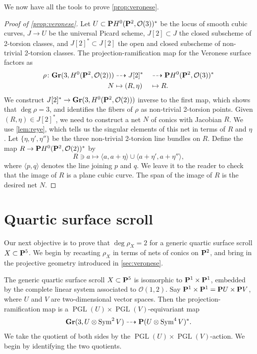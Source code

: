 \documentclass{amsart}
\renewcommand {\P}{{\bf P}}
\providecommand {\Gr}{{\bf Gr}}
\providecommand{\PGL}{\operatorname{PGL}}
\providecommand {\from}{{\colon}}
\providecommand{\Sym}{\operatorname{Sym}}
\numberwithin{equation}{section}
\renewcommand{\O}{\mathcal O}
\begin{document}
We now have all the tools to prove \autoref{prop:veronese}.
\begin{proof}[Proof of \autoref{prop:veronese}]
  Let $U \subset \P H^0(\P^2, \O(3))^*$ be the locus of smooth cubic curves, $J \to U$ be the universal Picard scheme, $J[2] \subset J$ the closed subscheme of 2-torsion classes, and $J[2]^* \subset J[2]$ the open and closed subscheme of non-trivial 2-torsion classes.
  The projection-ramification map for the Veronese surface factors as
  \begin{alignat*}{2}
    \rho \from \Gr(3, H^0(\P^2, \O(2))) &\dashrightarrow J[2]^* &&\dashrightarrow \P H^0(\P^2, \O(3))^*\\
    N &\mapsto (R, \eta) &&\mapsto R.
  \end{alignat*}
  We construct $J[2]^* \to \Gr(3,H^0(\P^2, \O(2)))$ inverse to the first map, which shows that $\deg \rho = 3$, and identifies the fibers of $\rho$ as non-trivial 2-torsion points.
  Given $(R, \eta) \in J[2]^*$, we need to construct a net $N$ of conics with Jacobian $R$.
  We use \autoref{lem:reye}, which tells us the singular elements of this net in terms of $R$ and $\eta$.
  Let $\{\eta, \eta', \eta''\}$ be the three non-trivial 2-torsion line bundles on $R$.
  Define the map $R \to \P H^0(\P^2, \O(2))^*$ by
  \[ R \ni a \mapsto \langle {a, a+\eta} \rangle \cup \langle {a+\eta', a+\eta''} \rangle ,\]
  where $\langle {p,q} \rangle$ denotes the line joining $p$ and $q$.
  We leave it to the reader to check that the image of $R$ is a plane cubic curve.
  The span of the image of $R$ is the desired net $N$.  
\end{proof}

\section{Quartic surface scroll}\label{sec:quartic_scroll}
Our next objective is to prove that $ \deg \rho_{X} = 2$ for a generic quartic surface scroll $X \subset \P^{5}$.
We begin by recasting $\rho_X$ in terms of nets of conics on $\P^2$, and bring in the projective geometry introduced in \autoref{sec:veronese}.

The generic quartic surface scroll $X \subset \P^5$ is isomorphic to $\P^1 \times \P^1$, embedded by the complete linear system associated to $\O(1,2)$.
Say $\P^1 \times \P^1 = \P U \times \P V$, where $U$ and $V$ are two-dimensional vector spaces.
Then the projection-ramification map is a $\PGL(U) \times \PGL(V)$-equivariant map
\[
  \Gr(3, U \otimes \Sym^2 V) \dashrightarrow \P(U \otimes \Sym^4 V)^*.
\]
We take the quotient of both sides by the $\PGL(U) \times \PGL(V)$-action.
We begin by identifying the two quotients.
\end{document}

